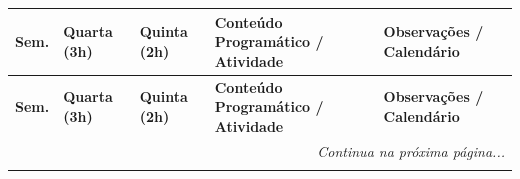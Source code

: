 \documentclass[12pt,a4paper]{article}
\begin{document}
\small
\begin{longtable}{p{0.8cm} p{1.8cm} p{1.8cm} p{7.7cm} p{4.3cm}}

\toprule
\textbf{\color{primary}Sem.} & \textbf{\color{primary}Quarta (3h)} & \textbf{\color{primary}Quinta (2h)} & \textbf{\color{primary}Conteúdo Programático / Atividade} & \textbf{\color{primary}Observações / Calendário} \\
\midrule
\endhead

\toprule
\textbf{\color{primary}Sem.} & \textbf{\color{primary}Quarta (3h)} & \textbf{\color{primary}Quinta (2h)} & \textbf{\color{primary}Conteúdo Programático / Atividade} & \textbf{\color{primary}Observações / Calendário} \\
\midrule
\endhead

\midrule
\multicolumn{5}{r}{\textit{\color{gray}Continua na próxima página...}} \\
\endfoot

\bottomrule
\endlastfoot


\end{longtable}
\end{document}
